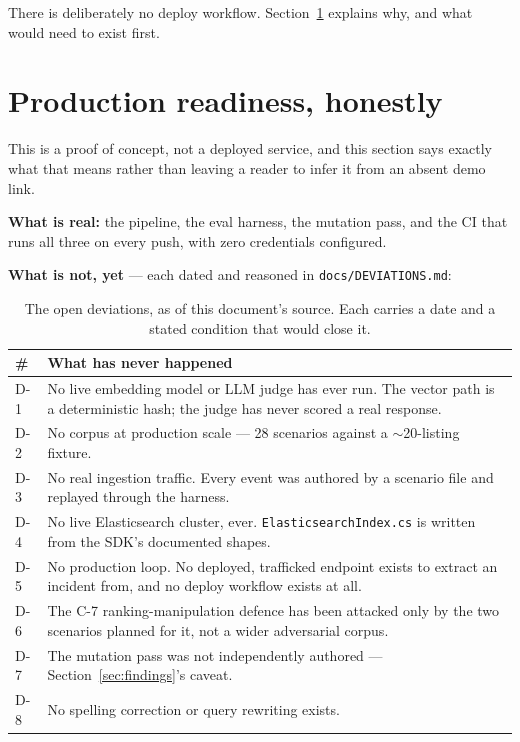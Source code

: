 \documentclass[11pt,a4paper]{article}
\begin{document}
There is deliberately no deploy workflow. Section~\ref{sec:readiness} explains
why, and what would need to exist first.

\section{Production readiness, honestly}
\label{sec:readiness}

This is a proof of concept, not a deployed service, and this section says
exactly what that means rather than leaving a reader to infer it from an
absent demo link.

\textbf{What is real:} the pipeline, the eval harness, the mutation pass, and
the CI that runs all three on every push, with zero credentials configured.

\textbf{What is not, yet} --- each dated and reasoned in
\texttt{docs/DEVIATIONS.md}:

\begin{table}[htbp]
\centering
\caption{The open deviations, as of this document's source. Each carries a
date and a stated condition that would close it.}
\begin{tabularx}{\linewidth}{@{}lX@{}}
\toprule
\textbf{\#} & \textbf{What has never happened} \\
\midrule
D-1 & No live embedding model or LLM judge has ever run. The vector path is a deterministic hash; the judge has never scored a real response. \\
D-2 & No corpus at production scale --- 28 scenarios against a $\sim$20-listing fixture. \\
D-3 & No real ingestion traffic. Every event was authored by a scenario file and replayed through the harness. \\
D-4 & No live Elasticsearch cluster, ever. \texttt{ElasticsearchIndex.cs} is written from the SDK's documented shapes. \\
D-5 & No production loop. No deployed, trafficked endpoint exists to extract an incident from, and no deploy workflow exists at all. \\
D-6 & The C-7 ranking-manipulation defence has been attacked only by the two scenarios planned for it, not a wider adversarial corpus. \\
D-7 & The mutation pass was not independently authored --- Section~\ref{sec:findings}'s caveat. \\
D-8 & No spelling correction or query rewriting exists. \\
\bottomrule
\end{tabularx}
\end{table}
\end{document}
